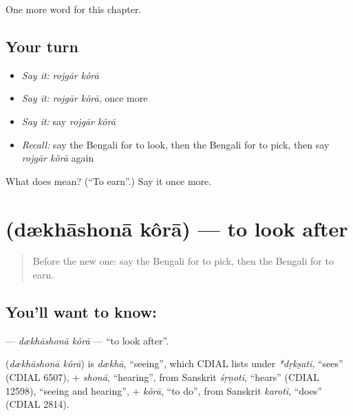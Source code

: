 \begin{grammarlens}[title={What you've built}]
One more word for this chapter.
\end{grammarlens}

\subsection*{Your turn}
\begin{itemize}
\raggedright
  \item \emph{Say it:} \emph{rojgār kôrā}
  \item \emph{Say it:} \emph{rojgār kôrā}, once more
  \item \emph{Say it:} say \emph{rojgār kôrā}
  \item \emph{Recall:} say the Bengali for to look, then the Bengali for to pick, then say \emph{rojgār kôrā} again
\end{itemize}

\begin{tcolorbox}[breakable,colback=teal!4,colframe=teal!35!black,title={Before you move on}]
What does   mean? (\textquotedblleft{}To earn\textquotedblright{}.) Say it once more.
\end{tcolorbox}
\section[\texorpdfstring{\bn{দেখাশোনা} \bn{করা} (dækhāshonā kôrā)}{দেখাশোনা করা (dækhāshonā kôrā)}]{  (dækhāshonā kôrā) — to look after}

\label{lesson:BN-C180-dkhashona-kora}



\begin{quote}
Before the new one: say the Bengali for to pick, then the Bengali for to earn.
\end{quote}

\subsection*{You'll want to know:  }
\textbf{ } — \emph{dækhāshonā kôrā} — \textquotedblleft{}to look after\textquotedblright{}.

\begin{cousinweb}
\textbf{ } (\emph{dækhāshonā kôrā}) is \emph{dækhā}, \textquotedblleft{}seeing\textquotedblright{}, which CDIAL lists under \emph{*dṛkṣati}, \textquotedblleft{}sees\textquotedblright{} (CDIAL 6507), + \emph{shonā}, \textquotedblleft{}hearing\textquotedblright{}, from Sanskrit \emph{śṛṇoti}, \textquotedblleft{}hears\textquotedblright{} (CDIAL 12598), \textquotedblleft{}seeing and hearing\textquotedblright{}, + \emph{kôrā}, \textquotedblleft{}to do\textquotedblright{}, from Sanskrit \emph{karoti}, \textquotedblleft{}does\textquotedblright{} (CDIAL 2814).
\end{cousinweb}


